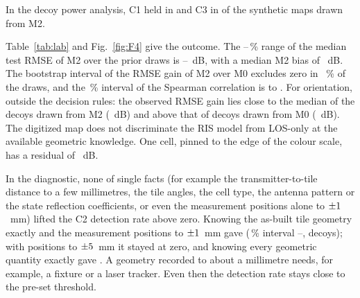 In the decoy power analysis, C1 held in \numLabDecoyConeDetections{} and C3
in \numLabDecoyCthreeDetections{} of the \numLabDecoys{} synthetic maps drawn from M2.


Table~\ref{tab:lab} and Fig.~\ref{fig:F4} give the outcome. The
\numQuantLoPct--\numQuantHiPct\,\% range of the median test RMSE of M2 over the prior draws is
\numLabRmseMtwoLo--\numLabRmseMtwoHi~dB, with a
median M2 bias of \numLabBiasMtwo~dB. The bootstrap interval of the RMSE gain of M2 over M0
excludes zero in \numLabCiExcludesPct~\% of the draws, and the \numCiPct\,\% interval of the
Spearman correlation is \numLabSpearmanLo{} to \numLabSpearmanHi. For
orientation, outside the decision rules: the observed RMSE gain lies close to the median
of the decoys drawn from M2 (\numLabDecoyDeltaMtwoDb~dB) and above that of decoys drawn from
M0 (\numLabDecoyDeltaMzeroDb~dB). The digitized map does not discriminate the RIS model from
LOS-only at the available geometric knowledge. One cell, pinned to the edge of the colour
scale, has a residual of \numLabResidualOutlierDb~dB.

\begin{figure}[t]
\centering
{}
\end{figure}

In the diagnostic, none of
\numLabDiagSingleFacts{} single facts (for example the transmitter-to-tile distance to a few
millimetres, the tile angles, the cell type, the antenna pattern or the state reflection
coefficients, or even the measurement positions alone to $\pm1$~mm) lifted
the C2 detection rate above zero. Knowing the as-built tile geometry
exactly and the measurement positions to $\pm1$~mm gave
\numLabDiagRate{} (\numCiPct\,\% interval \numLabDiagRateLo--\numLabDiagRateHi, \numLabDiagDecoys{} decoys);
with positions to $\pm5$~mm it stayed at zero, and knowing every
geometric quantity exactly gave \numLabDiagGeomRate. A geometry recorded to about a
millimetre needs, for example, a fixture or a laser tracker. Even then the
detection rate stays close to the pre-set threshold.

